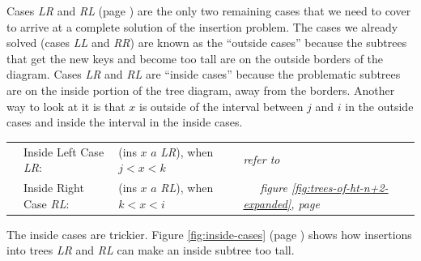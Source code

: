 Cases \emph{LR} and \emph{RL} (page \pageref{cases:ht-n+2})
are the only two remaining cases that we need to cover to arrive
at a complete solution of the insertion problem.
The cases we already solved
(cases \emph{LL} and \emph{RR})
are known as the
``outside cases''
because the subtrees that
get the new keys and become too tall are on the outside borders of the diagram.
Cases \emph{LR} and \emph{RL}
are ``inside cases''
because the problematic subtrees
are on the inside portion of the tree diagram, away from the borders.
Another way to look at it is that $x$ is outside of the interval
between $j$ and $i$ in the outside cases
and inside the interval in the inside cases.

\begin{center}
\begin{tabular}{llll}
\label{inside-lf} &Inside Left Case \emph{LR}:  &\textsf{(ins $x$ $a$} \emph{LR}\textsf{)}, when $j < x < k$ &
                    \emph{refer to} \\
\label{inside-rt} &Inside Right Case \emph{RL}: &\textsf{(ins $x$ $a$} \emph{RL}\textsf{)}, when $k < x < i$  &~~~\emph{figure \ref{fig:trees-of-ht-n+2-expanded}, page \pageref{fig:trees-of-ht-n+2-expanded}} \\
\end{tabular}
\end{center}
The inside cases are trickier.
Figure \ref{fig:inside-cases} (page \pageref{fig:inside-cases})
shows how insertions into trees \emph{LR} and \emph{RL}
can make an inside subtree too tall.

